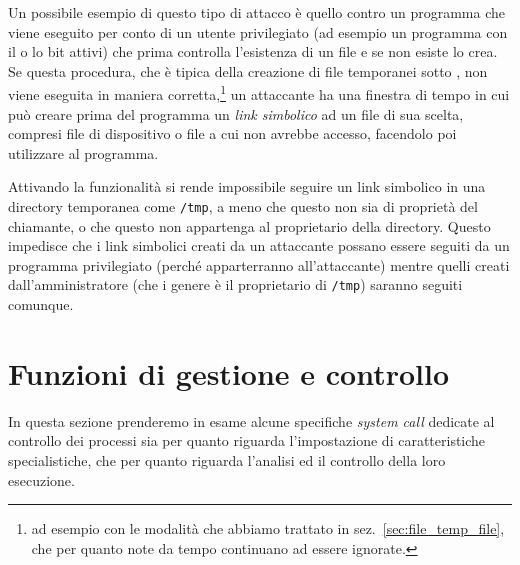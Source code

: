 \begin{basedescript}{\desclabelwidth{1cm}\desclabelstyle{\nextlinelabel}}
  Un possibile esempio di questo tipo di attacco è quello contro un programma
  che viene eseguito per conto di un utente privilegiato (ad esempio un
  programma con il  o lo  bit attivi) che prima controlla
  l'esistenza di un file e se non esiste lo crea. Se questa procedura, che è
  tipica della creazione di file temporanei sotto , non viene
  eseguita in maniera corretta,\footnote{ad esempio con le modalità che
    abbiamo trattato in sez.~\ref{sec:file_temp_file}, che per quanto note da
    tempo continuano ad essere ignorate.} un attaccante ha una finestra di
  tempo in cui può creare prima del programma un \textit{link simbolico} ad un
  file di sua scelta, compresi file di dispositivo o file a cui non avrebbe
  accesso, facendolo poi utilizzare al programma.

  Attivando la funzionalità si rende impossibile seguire un link simbolico in
  una directory temporanea come \texttt{/tmp}, a meno che questo non sia di
  proprietà del chiamante, o che questo non appartenga al proprietario della
  directory. Questo impedisce che i link simbolici creati da un attaccante
  possano essere seguiti da un programma privilegiato (perché apparterranno
  all'attaccante) mentre quelli creati dall'amministratore (che i genere è il
  proprietario di \texttt{/tmp}) saranno seguiti comunque.

\end{basedescript}









\section{Funzioni di gestione e controllo}
\label{sec:proc_manage_control}

In questa sezione prenderemo in esame alcune specifiche \textit{system call}
dedicate al controllo dei processi sia per quanto riguarda l'impostazione di
caratteristiche specialistiche, che per quanto riguarda l'analisi ed il
controllo della loro esecuzione.

